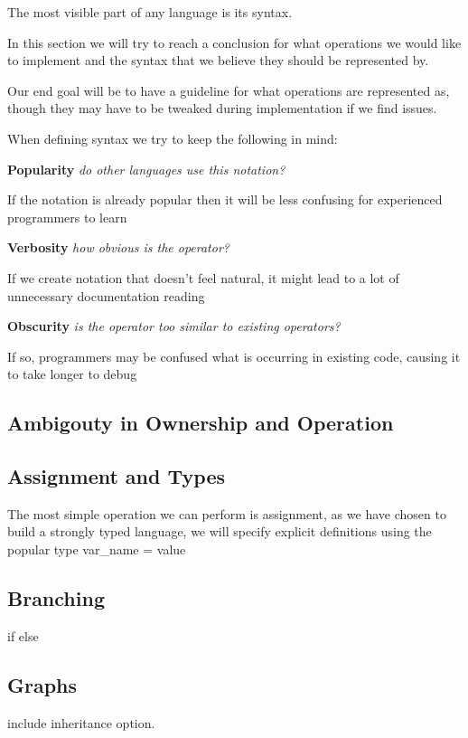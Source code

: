 The most visible part of any language is its syntax.

In this section we will try to reach a conclusion for what operations we would like to implement and the syntax
that we believe they should be represented by.

Our end goal will be to have a guideline for what operations are represented as, though they may have to be tweaked
during implementation if we find issues.

\bigskip

\noindent
When defining syntax we try to keep the following in mind:

\noindent
\textbf{Popularity} \- \textit{do other languages use this notation?}

If the notation is already popular then it will be less confusing for experienced programmers to learn

\noindent
\textbf{Verbosity} \- \textit{how obvious is the operator?}

If we create notation that doesn't feel natural, it might lead to a lot of unnecessary documentation reading

\noindent
\textbf{Obscurity} \- \textit{is the operator too similar to existing operators?}

If so, programmers may be confused what is occurring in existing code, causing it to take longer to debug

\subsection{Ambigouty in Ownership and Operation}

\subsection{Assignment and Types}
The most simple operation we can perform is assignment, as we have chosen to build a strongly typed language, we will
specify explicit definitions using the popular {type} {var_name} = {value}

\subsection{Branching}
if else

\subsection{Graphs}
include inheritance option.

